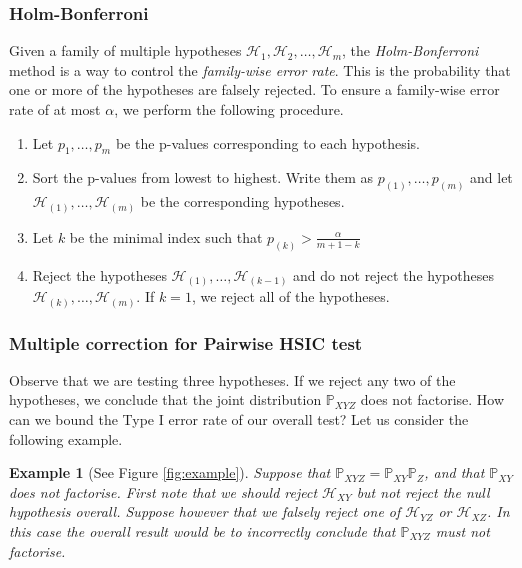 \documentclass[12pt]{article}
\newtheorem*{example}{Example}
\numberwithin{claim}{section}
\numberwithin{lemma}{section}
\numberwithin{theorem}{section}
\begin{document}
\subsubsection{Holm-Bonferroni}


Given a family of multiple hypotheses $\mathcal{H}_1,\mathcal{H}_2,\ldots ,\mathcal{H}_m$, the \emph{Holm-Bonferroni} method \cite{holm1979simple} is a way to control the \emph{family-wise error rate}. This is the probability that one or more of the hypotheses are falsely rejected. To ensure a family-wise error rate of at most $\alpha$, we perform the following procedure.

\begin{enumerate}
\item Let $p_1,\ldots,p_m$ be the p-values corresponding to each hypothesis.
\item Sort the p-values from lowest to highest. Write them as  $p_{(1)},\ldots ,p_{(m)}$ and let $\mathcal{H}_{(1)},\ldots,\mathcal{H}_{(m)}$ be the corresponding hypotheses.
\item Let $k$ be the minimal index such that $p_{(k)} > \frac{\alpha}{m+1-k}$
\item Reject the hypotheses $\mathcal{H}_{(1)},\ldots ,\mathcal{H}_{(k-1)}$ and do not reject the hypotheses $\mathcal{H}_{(k)},\ldots ,\mathcal{H}_{(m)}$. If $k=1$, we reject all of the hypotheses.
\end{enumerate}

\subsubsection{Multiple correction for Pairwise HSIC test}

Observe that we are testing three hypotheses. If we reject any two of the hypotheses, we conclude that the joint distribution $\mathbb{P}_{XYZ}$ does not factorise. How can we bound the Type I error rate of our overall test? Let us consider the following example.

\begin{example}[See Figure \ref{fig:example}]


Suppose that $\mathbb{P}_{XYZ} = \mathbb{P}_{XY}\mathbb{P}_{Z}$, and that $\mathbb{P}_{XY}$ does not factorise. First note that we should reject $\mathcal{H}_{XY}$ but not reject the null hypothesis overall. Suppose however that we falsely reject one of $\mathcal{H}_{YZ}$ or $\mathcal{H}_{XZ}$.  In this case the overall result would be to incorrectly conclude that $\mathbb{P}_{XYZ}$ must not factorise.
\end{example}
\end{document}
